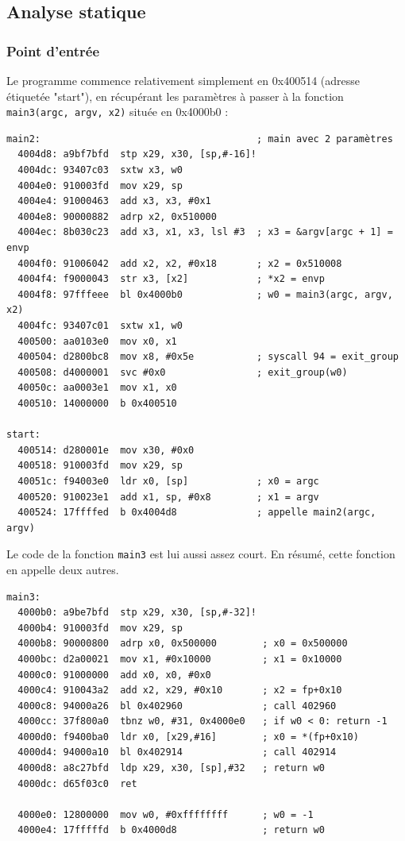 \documentclass[a4paper,10pt]{article}
\begin{document}
\subsection{Analyse statique}

\subsubsection{Point d'entrée}

Le programme commence relativement simplement en 0x400514 (adresse étiquetée "start"), en récupérant les paramètres à passer à la fonction \texttt{main3(argc, argv, x2)} située en 0x4000b0 :

\begin{verbatim}
main2:                                      ; main avec 2 paramètres
  4004d8: a9bf7bfd  stp x29, x30, [sp,#-16]!
  4004dc: 93407c03  sxtw x3, w0
  4004e0: 910003fd  mov x29, sp
  4004e4: 91000463  add x3, x3, #0x1
  4004e8: 90000882  adrp x2, 0x510000
  4004ec: 8b030c23  add x3, x1, x3, lsl #3  ; x3 = &argv[argc + 1] = envp
  4004f0: 91006042  add x2, x2, #0x18       ; x2 = 0x510008
  4004f4: f9000043  str x3, [x2]            ; *x2 = envp
  4004f8: 97fffeee  bl 0x4000b0             ; w0 = main3(argc, argv, x2)
  4004fc: 93407c01  sxtw x1, w0
  400500: aa0103e0  mov x0, x1
  400504: d2800bc8  mov x8, #0x5e           ; syscall 94 = exit_group
  400508: d4000001  svc #0x0                ; exit_group(w0)
  40050c: aa0003e1  mov x1, x0
  400510: 14000000  b 0x400510

start:
  400514: d280001e  mov x30, #0x0
  400518: 910003fd  mov x29, sp
  40051c: f94003e0  ldr x0, [sp]            ; x0 = argc
  400520: 910023e1  add x1, sp, #0x8        ; x1 = argv
  400524: 17ffffed  b 0x4004d8              ; appelle main2(argc, argv)
\end{verbatim}

Le code de la fonction \texttt{main3} est lui aussi assez court. En résumé, cette fonction en appelle deux autres.

\begin{verbatim}
main3:
  4000b0: a9be7bfd  stp x29, x30, [sp,#-32]!
  4000b4: 910003fd  mov x29, sp
  4000b8: 90000800  adrp x0, 0x500000        ; x0 = 0x500000
  4000bc: d2a00021  mov x1, #0x10000         ; x1 = 0x10000
  4000c0: 91000000  add x0, x0, #0x0
  4000c4: 910043a2  add x2, x29, #0x10       ; x2 = fp+0x10
  4000c8: 94000a26  bl 0x402960              ; call 402960
  4000cc: 37f800a0  tbnz w0, #31, 0x4000e0   ; if w0 < 0: return -1
  4000d0: f9400ba0  ldr x0, [x29,#16]        ; x0 = *(fp+0x10)
  4000d4: 94000a10  bl 0x402914              ; call 402914
  4000d8: a8c27bfd  ldp x29, x30, [sp],#32   ; return w0
  4000dc: d65f03c0  ret

  4000e0: 12800000  mov w0, #0xffffffff      ; w0 = -1
  4000e4: 17fffffd  b 0x4000d8               ; return w0
\end{verbatim}
\end{document}
